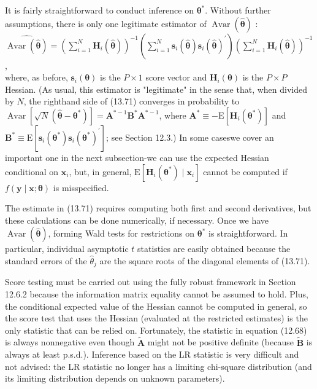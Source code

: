 \documentclass[10pt]{article}
\begin{document}
It is fairly straightforward to conduct inference on $\boldsymbol{\theta}^{*}$. Without further assumptions, there is only one legitimate estimator of $\operatorname{Avar}(\hat{\boldsymbol{\theta}})$ :\\
$\widehat{\operatorname{Avar}(\hat{\boldsymbol{\theta}})}=\left(\sum_{i=1}^{N} \mathbf{H}_{i}(\hat{\boldsymbol{\theta}})\right)^{-1}\left(\sum_{i=1}^{N} \mathbf{s}_{i}(\hat{\boldsymbol{\theta}}) \mathbf{s}_{i}(\hat{\boldsymbol{\theta}})^{\prime}\right)\left(\sum_{i=1}^{N} \mathbf{H}_{i}(\hat{\boldsymbol{\theta}})\right)^{-1}$,\\
where, as before, $\mathbf{s}_{i}(\boldsymbol{\theta})$ is the $P \times 1$ score vector and $\mathbf{H}_{i}(\boldsymbol{\theta})$ is the $P \times P$ Hessian. (As usual, this estimator is "legitimate" in the sense that, when divided by $N$, the righthand side of (13.71) converges in probability to $\operatorname{Avar}\left[\sqrt{N}\left(\hat{\boldsymbol{\theta}}-\boldsymbol{\theta}^{*}\right)\right]=\mathbf{A}^{*-1} \mathbf{B}^{*} \mathbf{A}^{*-1}$, where $\mathbf{A}^{*} \equiv-\mathrm{E}\left[\mathbf{H}_{i}\left(\boldsymbol{\theta}^{*}\right)\right]$ and $\mathbf{B}^{*} \equiv \mathrm{E}\left[\mathbf{s}_{i}\left(\boldsymbol{\theta}^{*}\right) \mathbf{s}_{i}\left(\boldsymbol{\theta}^{*}\right)^{\prime}\right]$; see Section 12.3.) In some caseswe cover an important one in the next subsection-we can use the expected Hessian\\
conditional on $\mathbf{x}_{i}$, but, in general, $\mathrm{E}\left[\mathbf{H}_{i}\left(\boldsymbol{\theta}^{*}\right) \mid \mathbf{x}_{i}\right]$ cannot be computed if $f(\mathbf{y} \mid \mathbf{x} ; \boldsymbol{\theta})$ is misspecified.

The estimate in (13.71) requires computing both first and second derivatives, but these calculations can be done numerically, if necessary. Once we have $\operatorname{Avar}(\hat{\boldsymbol{\theta}})$, forming Wald tests for restrictions on $\boldsymbol{\theta}^{*}$ is straightforward. In particular, individual asymptotic $t$ statistics are easily obtained because the standard errors of the $\hat{\theta}_{j}$ are the square roots of the diagonal elements of (13.71).

Score testing must be carried out using the fully robust framework in Section 12.6.2 because the information matrix equality cannot be assumed to hold. Plus, the conditional expected value of the Hessian cannot be computed in general, so the score test that uses the Hessian (evaluated at the restricted estimates) is the only statistic that can be relied on. Fortunately, the statistic in equation (12.68) is always nonnegative even though $\tilde{\mathbf{A}}$ might not be positive definite (because $\tilde{\mathbf{B}}$ is always at least p.s.d.). Inference based on the LR statistic is very difficult and not advised: the LR statistic no longer has a limiting chi-square distribution (and its limiting distribution depends on unknown parameters).
\end{document}
